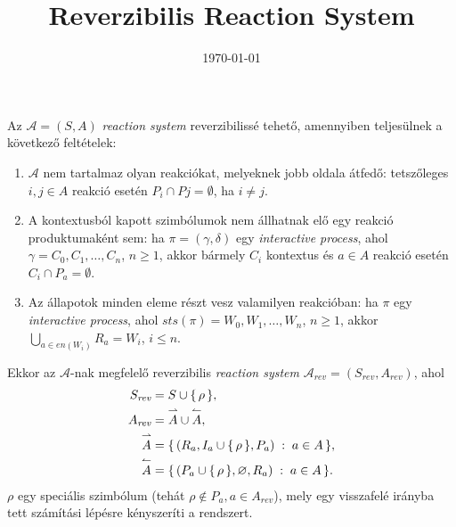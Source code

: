 \documentclass[12pt]{article}
\title{Reverzibilis Reaction System}
\date{\today}
\begin{document}
    \maketitle

    \begin{definition*}
        Az $\mathcal{A} = (S, A)$ \textit{reaction system} reverzibilissé tehető, amennyiben teljesülnek a következő feltételek:
        \begin{enumerate}[label={(\arabic*)}]
            \item
            $\mathcal{A}$ nem tartalmaz olyan reakciókat, melyeknek jobb oldala átfedő: tetszőleges $i, j \in A$ reakció esetén $P_{i} \cap P{j} = \emptyset$, ha $i \neq j$.

            \item
            A kontextusból kapott szimbólumok nem állhatnak elő egy reakció produktumaként sem: ha $\pi = (\gamma, \delta)$ egy \textit{interactive process}, ahol $\gamma = C_{0}, C_{1}, \ldots, C_{n}$, $n \geq 1$, akkor bármely $C_{i}$ kontextus és $a \in A$ reakció esetén $C_{i} \cap P_{a} = \emptyset$.

            \item
            Az állapotok minden eleme részt vesz valamilyen reakcióban: ha $\pi$ egy \textit{interactive process}, ahol $\textit{sts}(\pi) = W_{0}, W_{1}, \ldots, W_{n}$, $n \geq 1$, akkor $\bigcup_{a \in \textit{en}(W_{i})} R_{a} = W_{i}$, $i \leq n$.
        \end{enumerate}
        Ekkor az $\mathcal{A}$-nak megfelelő reverzibilis \textit{reaction system} $\mathcal{A}_{\textit{rev}} = (S_{\textit{rev}}, A_{\textit{rev}})$, ahol
        \begin{align*}
            S_{\textit{rev}} &= S \cup \{ \, \rho \, \}, \\
            A_{\textit{rev}} &= \overset{\rightharpoonup} A \cup \overset{\leftharpoonup} A, \\ 
            \overset{\rightharpoonup} A &= \{ \, (R_{a}, I_{a} \cup \{ \, \rho \, \}, P_{a}) \; : \; a \in A \, \}, \\
            \overset{\leftharpoonup} A &= \{ \, (P_{a} \cup \{ \, \rho \, \}, \varnothing, R_{a}) \; : \; a \in A \, \}.
        \end{align*}
        $\rho$ egy speciális szimbólum (tehát $\rho \notin P_{a}, a \in A_{\textit{rev}}$), mely egy visszafelé irányba tett számítási lépésre kényszeríti a rendszert.
    \end{definition*}
\end{document}

